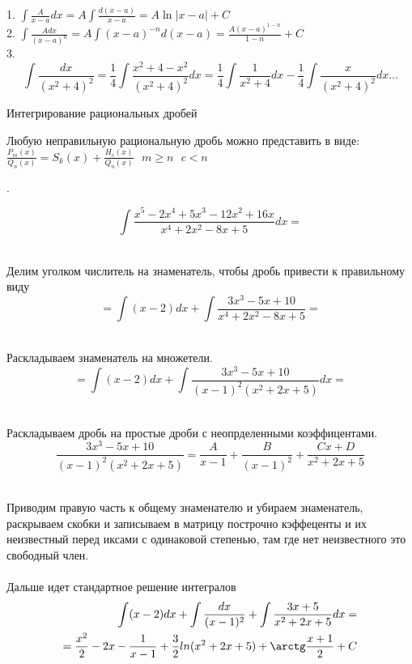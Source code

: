 1. $\int \frac{A}{x-a}dx = A\int \frac{d(x-a)}{x-a} = A\ln|x-a| + C$\\
2. $\int \frac{Adx}{(x-a)^n} = A\int (x-a)^{-n}d(x-a)
  = \frac{A(x-a)^{1-n}}{1-n} + C$\\
3.
$$
\int \frac{dx}{(x^2+4)^2} = \frac{1}{4} \int \frac{x^2 + 4 - x^2}{(x^2 + 4)^2}
dx = \frac{1}{4}\int \frac{1}{x^2 + 4} dx -
\frac{1}{4} \int \frac{x}{(x^2+4)^2}dx \ldots
$$

\begin{title}[\Large]
  Интегрирование рациональных дробей
\end{title}
Любую неправильную рациональную дробь можно представить в виде:\\
$\frac{P_m(x)}{Q_n(x)} = S_k(x) + \frac{H_c(x)}{Q_n(x)} ~~~ m \ge n ~~~ c < n$

\begin{center}
  .
\end{center}

\[\int \frac{x^5 - 2x^4 + 5x^3 - 12x^2 + 16x}{x^4 + 2x^2 - 8x + 5} dx = \]

\\
Делим уголком числитель на знаменатель, чтобы дробь привести к правильному виду
\[= \int (x - 2)dx + \int \frac{3x^3 - 5x + 10}{x^4 + 2x^2 - 8x + 5} = \]

\\
Раскладываем знаменатель на множетели.
\[= \int (x - 2)dx + \int \frac{3x^3 - 5x + 10}{(x-1)^2 (x^2+2x+5)} dx = \]

\\
Раскладываем дробь на простые дроби с неопрделенными коэффицентами.
\[
  \frac{3x^3 - 5x + 10}{(x-1)^2 (x^2+2x+5)} = \frac{A}{x - 1} +
  \frac{B}{(x - 1)^2} + \frac{Cx + D}{x^2 + 2x + 5}
\]

\\
Приводим правую часть к общему знаменателю и убираем знаменатель, раскрываем
скобки и записываем в матрицу построчно кэффеценты и их неизвестный перед
иксами с одинаковой степенью, там где нет неизвестного это свободный член.\\

\\
Дальше идет стандартное решение интегралов
\begin{eqnarray*}
  \int (x - 2)dx + \int \frac{dx}{(x - 1)^2} + \int \frac{3x + 5}{x^2 + 2x + 5}
    dx = \\
  =\frac{x^2}{2} - 2x - \frac{1}{x-1} + \frac{3}{2} ln(x^2 + 2x + 5) + \arctg
    \frac{x + 1}{2} + C
\end{eqnarray*}

